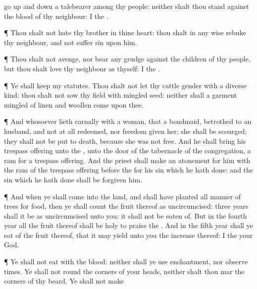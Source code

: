 {go up and down
{} a
talebearer among thy
people: neither shalt thou
stand against the
blood of thy
neighbour: I
{} the
{}.
\par }{\PP {}¶ Thou shalt not
hate thy
brother in thine
heart: thou shalt in any
wise
rebuke thy
neighbour, and not
suffer
sin upon him.
\par }{\PP {}¶ Thou shalt not
avenge, nor bear any
grudge against the
children of thy
people, but thou shalt
love thy
neighbour as
thyself: I
{} the
{}.
\par }{\PP {}¶ Ye shall
keep my
statutes. Thou shalt not let thy
cattle
gender with a diverse
kind: thou shalt not
sow thy
field with mingled
seed: neither shall a
garment
mingled of linen and
woollen
come upon thee.
\par }{\PP {}¶ And
whosoever
lieth
carnally with a
woman, that
{} a
bondmaid,
betrothed to an
husband, and not at
all
redeemed, nor
freedom
given her; she shall be
scourged; they shall not be put to
death, because she was not
free.
And he shall
bring his trespass
offering unto the
{}, unto the
door of the
tabernacle of the
congregation,
{} a
ram for a trespass
offering.
And the
priest shall make an
atonement for him with the
ram of the trespass
offering
before the
{} for his
sin which he hath
done: and the
sin which he hath
done shall be
forgiven him.
\par }{\PP {}¶ And when ye shall
come into the
land, and shall have
planted all manner of
trees for
food, then ye shall
count the
fruit thereof as
uncircumcised:
three
years shall it be as
uncircumcised unto you: it shall not be
eaten of.
But in the
fourth
year all the
fruit thereof shall be
holy to
praise the
{}
{}.
And in the
fifth
year shall ye
eat of the
fruit thereof, that it may
yield unto you the
increase thereof: I
{} the
{} your
God.
\par }{\PP {}¶ Ye shall not
eat
{} with the
blood: neither shall ye use
enchantment, nor observe
times.
Ye shall not
round the
corners of your
heads, neither shalt thou
mar the
corners of thy
beard.
Ye shall not
make
}
